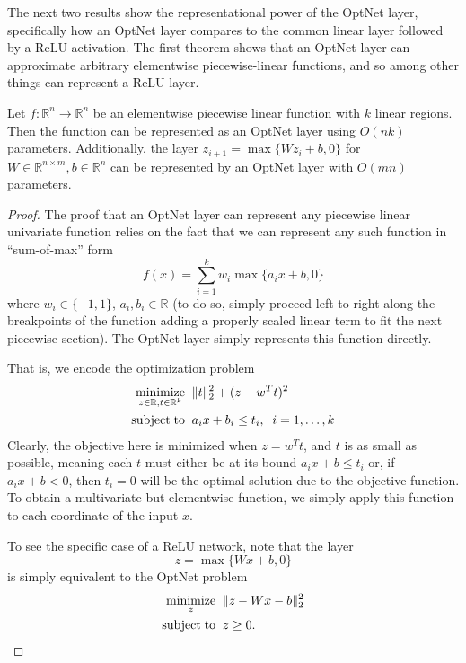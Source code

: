 The next two results show the representational power of the OptNet layer,
specifically how an OptNet layer compares to the common linear layer followed by
a ReLU activation.  The first theorem shows that an OptNet layer can
approximate arbitrary elementwise piecewise-linear functions, and so among other
things can represent a ReLU layer.

\begin{theorem}
    \label{theorem:pwlinear}
    Let $f: \mathbb{R}^n \rightarrow \mathbb{R}^n$ be an elementwise piecewise
    linear function with $k$ linear regions.  Then the function can be represented
    as an OptNet layer using $O(nk)$ parameters.  Additionally, the layer $z_{i+1} =
        \max\{Wz_i + b, 0\}$ for $W \in \mathbb{R}^{n \times m}, b \in \mathbb{R}^n$ can
    be represented by an OptNet layer with $O(mn)$ parameters.
\end{theorem}

\begin{proof}
    The proof that an OptNet layer can represent any piecewise linear univariate
    function relies on the fact that we can represent any such function in
    ``sum-of-max'' form
    \begin{equation}
        f(x) = \sum_{i=1}^k w_i \max\{a_i x + b, 0\}
    \end{equation}
    where $w_i \in \{-1,1\}$, $a_i,b_i \in \mathbb{R}$ (to do so, simply proceed
    left to right along the breakpoints of the function adding a properly scaled
    linear term to fit the next piecewise section).  The OptNet layer simply
    represents this function directly.

    That is, we encode the optimization problem
    \begin{equation}
        \begin{split}
            \operatorname*{minimize}_{z \in \mathbb{R},t\in \mathbb{R}^k} \;\; &  \|t\|_2^2 + (z - w^T t)^2 \\
            \operatorname*{subject\;to} \;\; & a_i x + b_i \leq t_i, \;\; i=1,\ldots,k
        \end{split}
    \end{equation}
    Clearly, the objective here is minimized when $z = w^T t$, and $t$ is as small
    as possible, meaning each $t$ must either be at its bound $a_i x + b \leq
        t_i$ or, if $a_i x + b < 0$, then $t_i = 0$ will be the optimal solution due to
    the objective function.  To obtain a multivariate but elementwise function, we
    simply apply
    this function to each coordinate of the input $x$.

    To see the specific case of a ReLU network, note that the layer
    \begin{equation}
        z = \max\{Wx + b, 0\}
    \end{equation}
    is simply equivalent to the OptNet problem
    \begin{equation}
        \begin{split}
            \operatorname*{minimize}_{z} \;\; & \|z - Wx - b\|_2^2 \\
            \operatorname*{subject\;to} \;\; & z \geq 0.
        \end{split}
    \end{equation}
\end{proof}


